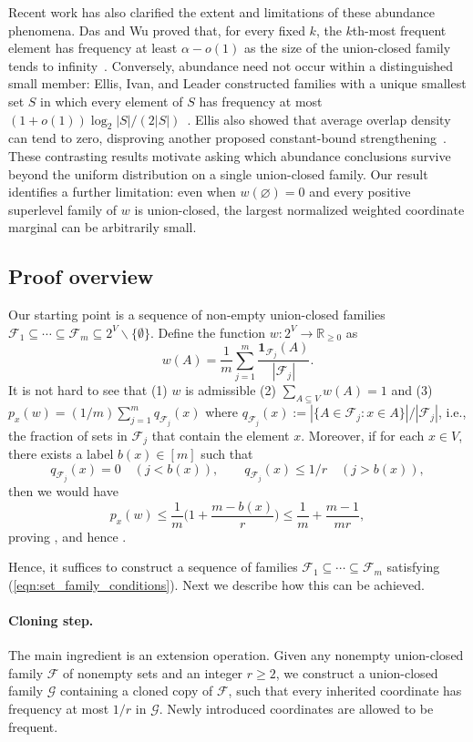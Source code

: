 \documentclass[11pt]{article}
\newcommand{\rr}{\mathbb{R}}
\newcommand{\<}{\langle}
\renewcommand{\>}{\rangle}
\newcommand{\calF}{\mathcal{F}}
\newcommand{\F}{\mathcal{F}}
\numberwithin{equation}{section}
\begin{document}
Recent work has also clarified the extent and limitations of these abundance phenomena. Das and Wu proved that, for every fixed $k$, the $k$th-most frequent element has frequency at least $\alpha-o(1)$ as the size of the union-closed family tends to infinity~\cite{DasWu2024}. Conversely, abundance need not occur within a distinguished small member: Ellis, Ivan, and Leader constructed families with a unique smallest set $S$ in which every element of $S$ has frequency at most $(1+o(1))\log_2|S|/(2|S|)$~\cite{EIL}. Ellis also showed that average overlap density can tend to zero, disproving another proposed constant-bound strengthening~\cite{Ellis2020}. These contrasting results motivate asking which abundance conclusions survive beyond the uniform distribution on a single union-closed family. Our result identifies a further limitation: even when $w(\varnothing)=0$ and every positive superlevel family of $w$ is union-closed, the largest normalized weighted coordinate marginal can be arbitrarily small.


\subsection{Proof overview}

Our starting point is a sequence of non-empty union-closed families $\calF_1 \subseteq \cdots \subseteq \calF_m \subseteq 2^V \backslash \{\emptyset\}$. Define the function $w: 2^V \to \rr_{\geq 0}$ as 
\[
w(A) = \frac{1}{m} \sum_{j=1}^m \frac{\mathbf{1}_{\calF_j}(A)}{|\calF_j|}.
\]
It is not hard to see that (1) $w$ is admissible (2) $\sum_{A \subseteq V} w(A) = 1$ and (3) $p_x(w) = (1/m) \sum_{j=1}^m q_{\calF_j}(x)$ where $q_{\calF_j}(x):= |\{A \in \calF_j: x \in A\}| / |\calF_j|$, i.e., the fraction of sets in $\calF_j$ that contain the element $x$. Moreover, if for each $x \in V$, there exists a label $b(x) \in [m]$ such that 
\begin{equation}\label{eqn:set_family_conditions}
     q_{\F_j}(x)=0\quad(j<b(x)),\qquad
 q_{\F_j}(x)\le1/r\quad(j>b(x)),
\end{equation}
then we would have
\[
p_x(w) \leq \frac{1}{m}\Big(1 + \frac{m-b(x)}{r} \Big) \leq \frac{1}{m} + \frac{m-1}{mr},
\]
proving , and hence . 

Hence, it suffices to construct a sequence of families $\calF_1 \subseteq \cdots \subseteq \calF_m$ satisfying (\ref{eqn:set_family_conditions}). Next we describe how this can be achieved.

\paragraph{Cloning step.} The main ingredient is an extension operation. Given any nonempty union-closed family \(\mathcal F\) of nonempty sets and an integer \(r\ge2\), we construct a union-closed family \(\mathcal G\) containing a cloned copy of \(\mathcal F\), such that every inherited coordinate has frequency at most \(1/r\) in \(\mathcal G\). Newly introduced coordinates are allowed to be frequent.
\end{document}
